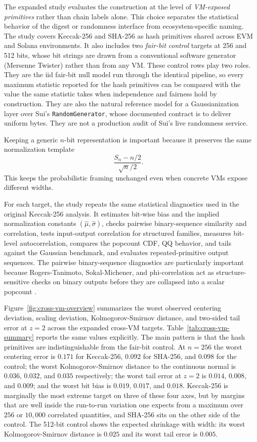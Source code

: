 \documentclass[11pt]{article}
\begin{document}
The expanded study evaluates the construction at the level of
\emph{VM-exposed primitives} rather than chain labels alone. This choice
separates the statistical behavior of the digest or randomness interface from
ecosystem-specific naming. The study covers Keccak-256 and SHA-256 as hash
primitives shared across EVM and Solana environments. It also includes two
\emph{fair-bit control} targets at 256 and 512 bits, whose bit strings are
drawn from a conventional software generator (Mersenne Twister) rather than
from any VM. These control rows play two roles. They are the iid fair-bit
null model run through the identical pipeline, so every maximum statistic
reported for the hash primitives can be compared with the value the same
statistic takes when independence and fairness hold by construction. They are
also the natural reference model for a Gaussianization layer over Sui's
\texttt{RandomGenerator}, whose documented contract is to deliver uniform
bytes. They are not a production audit of Sui's live randomness service.

Keeping a generic $n$-bit representation is important because it preserves the
same normalization template
\[
\frac{S_n-n/2}{\sqrt{n}/2}.
\]
This keeps the probabilistic framing unchanged even when concrete VMs expose
different widths.

For each target, the study repeats the same statistical diagnostics used in the
original Keccak-256 analysis. It estimates bit-wise bias and the implied
normalization constants $(\hat\mu,\hat\sigma)$, checks pairwise
binary-sequence similarity and correlation, tests input-output correlation for
structured families, measures bit-level autocorrelation, compares the popcount
CDF, QQ behavior, and tails against the Gaussian benchmark, and evaluates
repeated-primitive output sequences. The pairwise binary-sequence diagnostics
are particularly important because Rogers-Tanimoto, Sokal-Michener, and
phi-correlation act as structure-sensitive checks on binary outputs before
they are collapsed into a scalar popcount
\citep{RogersTanimoto1960,SokalMichener1958}.

Figure~\ref{fig:cross-vm-overview} summarizes the worst observed centering
deviation, scaling deviation, Kolmogorov-Smirnov distance, and two-sided tail
error at $z=2$ across the expanded cross-VM targets.
Table~\ref{tab:cross-vm-summary}
reports the same values explicitly. The main pattern is that the hash
primitives are indistinguishable from the fair-bit control. At $n=256$ the
worst centering error is $0.171$ for Keccak-256, $0.092$ for SHA-256, and
$0.098$ for the control; the worst Kolmogorov-Smirnov distance to the
continuous normal is $0.036$, $0.032$, and $0.035$ respectively; the worst
tail error at $z=2$ is $0.014$, $0.008$, and $0.009$; and the worst bit bias
is $0.019$, $0.017$, and $0.018$. Keccak-256 is marginally the most extreme
target on three of these four axes, but by margins that are well inside the
run-to-run variation one expects from a maximum over $256$ or $10{,}000$
correlated quantities, and SHA-256 sits on the other side of the control. The
512-bit control shows the expected shrinkage with width: its worst
Kolmogorov-Smirnov distance is $0.025$ and its worst tail error is $0.005$.
\end{document}
